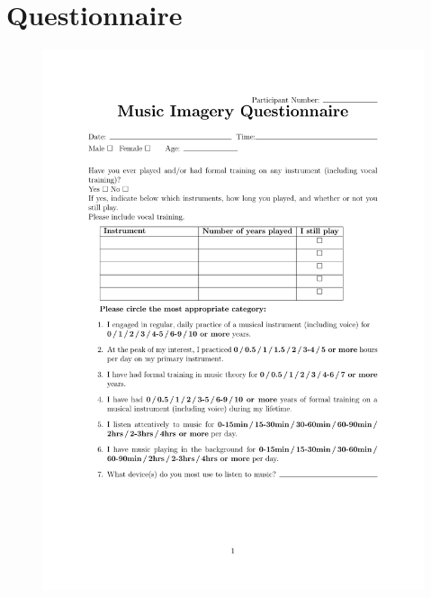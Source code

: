 \chapter{Questionnaire}\label{appendix:questionnaire}

%

\begin{figure}[h]
%
%
   {\includegraphics[width=1.2\textwidth]{Figures/questionnaire-1.pdf}}
\end{figure}
%
